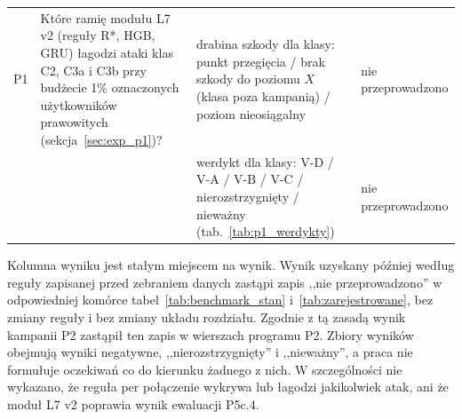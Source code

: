 \documentclass[a4paper,12pt]{article}
\begin{document}
\begin{table}[H]
\begin{tabularx}{\linewidth}{@{}L{1.2cm}L{4.0cm}YL{1.9cm}@{}}
\midrule
P1 & Które ramię modułu L7 v2 (reguły R*, HGB, GRU) łagodzi ataki klas C2, C3a i C3b przy budżecie 1\% oznaczonych użytkowników prawowitych (sekcja~\ref{sec:exp_p1})? & drabina szkody dla klasy: punkt przegięcia / brak szkody do poziomu $X$ (klasa poza kampanią) / poziom nieosiągalny & nie przeprowadzono \\
 & & werdykt dla klasy: V-D / V-A / V-B / V-C / nierozstrzygnięty / nieważny (tab.~\ref{tab:p1_werdykty}) & nie przeprowadzono \\
\bottomrule
\end{tabularx}
\end{table}

Kolumna wyniku jest stałym miejscem na wynik. Wynik uzyskany później według reguły zapisanej przed zebraniem danych zastąpi zapis ,,nie przeprowadzono'' w odpowiedniej komórce tabel~\ref{tab:benchmark_stan} i~\ref{tab:zarejestrowane}, bez zmiany reguły i bez zmiany układu rozdziału. Zgodnie z tą zasadą wynik kampanii P2 zastąpił ten zapis w wierszach programu P2. Zbiory wyników obejmują wyniki negatywne, ,,nierozstrzygnięty'' i ,,nieważny'', a praca nie formułuje oczekiwań co do kierunku żadnego z nich. W szczególności nie wykazano, że reguła per połączenie wykrywa lub łagodzi jakikolwiek atak, ani że moduł L7 v2 poprawia wynik ewaluacji P5c.4.
\end{document}
